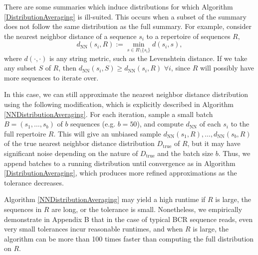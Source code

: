 \documentclass{article}
\begin{document}
There are some summaries which induce distributions for which Algorithm \ref{DistributionAveraging} is ill-suited.
This occurs when a subset of the summary does not follow the same distribution as the full summary.
For example, consider the nearest neighbor distance of a sequence $s_i$ to a repertoire of sequences $R$,
\begin{equation}
d_\text{NN}(s_i, R) := \min_{s \in R \setminus \{s_i\}} d(s_i, s),
\end{equation}
where $d(\cdot, \cdot)$ is any string metric, such as the Levenshtein distance.
If we take any subset $S$ of $R$, then $d_\text{NN}(s_i, S) \ge d_\text{NN}(s_i, R)$ $\forall i$, since $R$ will possibly have more sequences to iterate over.

In this case, we can still approximate the nearest neighbor distance distribution using the following modification, which is explicitly described in Algorithm \ref{NNDistributionAveraging}.
For each iteration, sample a small batch $B = (s_1, \dotsc, s_b)$ of $b$ sequences (e.g. $b = 50$), and compute $d_\text{NN}$ of each $s_i$ to the full repertoire $R$.
This will give an unbiased sample $d_\text{NN}(s_1, R), \dotsc, d_\text{NN}(s_b, R)$ of the true nearest neighbor distance distribution $D_\text{true}$ of $R$, but it may have significant noise depending on the nature of $D_\text{true}$ and the batch size $b$.
Thus, we append batches to a running distribution until convergence as in Algorithm \ref{DistributionAveraging}, which produces more refined approximations as the tolerance decreases.

Algorithm \ref{NNDistributionAveraging} may yield a high runtime if $R$ is large, the sequences in $R$ are long, or the tolerance is small.
Nonetheless, we empirically demonstrate in Appendix B that in the case of typical BCR sequence reads, even very small tolerances incur reasonable runtimes, and when $R$ is large, the algorithm can be more than 100 times faster than computing the full distribution on $R$.
\end{document}
